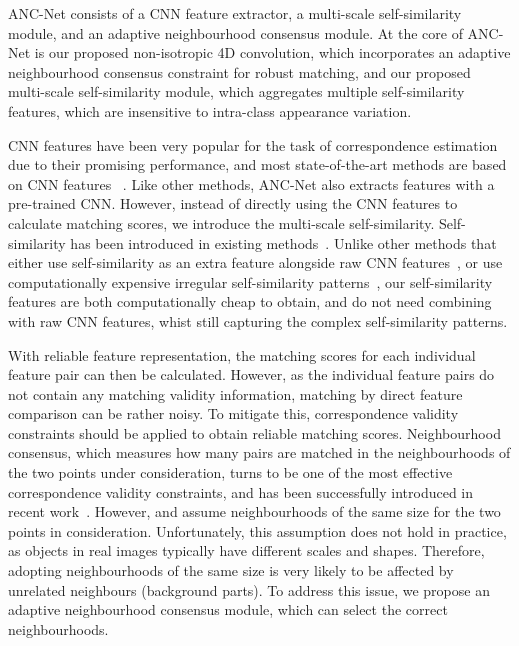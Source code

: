 \documentclass[10pt,twocolumn,letterpaper]{article}
\begin{document}
ANC-Net consists of a CNN feature extractor, a multi-scale self-similarity module, and an adaptive neighbourhood consensus module.
At the core of ANC-Net is our proposed non-isotropic 4D convolution, which incorporates an adaptive neighbourhood consensus constraint for robust matching, and our proposed multi-scale self-similarity module, which aggregates multiple self-similarity features, which are insensitive to intra-class appearance variation\cite{Kim_CVPR17_FCSS}. 

CNN features have been very popular for the task of correspondence estimation due to their promising performance, and most state-of-the-art methods are based on CNN features ~\cite{Rocco_NIPS18_NCNet,min2019hyperpixel,Huang_ICCV19_DCCNet,Kim_CVPR17_FCSS,Choy_NIPS16_UCN}.
Like other methods, ANC-Net also extracts features with a pre-trained CNN. 
However, instead of directly using the CNN features to calculate matching scores, we introduce the multi-scale self-similarity.
Self-similarity has been introduced in existing methods~\cite{Huang_ICCV19_DCCNet,Kim_CVPR17_FCSS}.
Unlike other methods that either use self-similarity as an extra feature alongside raw CNN features~\cite{Huang_ICCV19_DCCNet}, or use computationally expensive irregular self-similarity patterns~\cite{Kim_CVPR17_FCSS}, our self-similarity features are both computationally cheap to obtain, and do not need combining with raw CNN features, whist still capturing the complex self-similarity patterns.

With reliable feature representation, the matching scores for each individual feature pair can then be calculated.
However, as the individual feature pairs do not contain any matching validity information, matching by direct feature comparison can be rather noisy.
To mitigate this, correspondence validity constraints should be applied to obtain reliable matching scores.
Neighbourhood consensus, which measures how many pairs are matched in the neighbourhoods of the two points under consideration, turns to be one of the most effective correspondence validity constraints, and has been successfully introduced in recent work~\cite{Rocco_NIPS18_NCNet,Huang_ICCV19_DCCNet}.
However, \cite{Rocco_NIPS18_NCNet} and \cite{Huang_ICCV19_DCCNet} assume neighbourhoods of the same size for the two points in consideration.
Unfortunately, this assumption does not hold in practice, as objects in real images typically have different scales and shapes.
Therefore, adopting neighbourhoods of the same size is very likely to be affected by unrelated neighbours (\eg background parts).
To address this issue, we propose an adaptive neighbourhood consensus module, which can select the correct neighbourhoods. 
\end{document}
